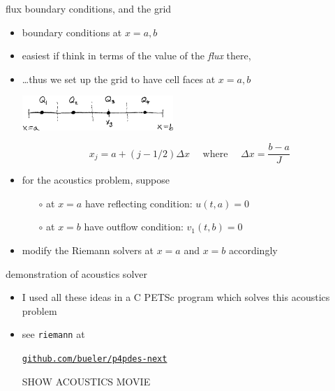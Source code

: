 \documentclass[10pt,dvipsnames,usepdftitle=false,
hyperref={pdftitle = {Finite volume methods},
    pdfauthor = {Ed Bueler}}]{beamer}
\begin{document}
\begin{frame}{flux boundary conditions, and the grid}

\begin{itemize}
\item boundary conditions at $x=a,b$
\item easiest if think in terms of the value of the \emph{flux} there,
\item \dots thus we set up the grid to have cell faces at $x=a,b$

\medskip
\begin{center}
\includegraphics[width=0.45\textwidth]{figs/fluxbdrysketch}
\end{center}

\vspace{-2mm}
    $$x_j = a + (j-1/2) \Delta x \quad \text{ where } \quad \Delta x = \frac{b-a}{J}$$

\item for the acoustics problem, suppose
    \begin{itemize}
    \item[$\circ$] at $x=a$ have reflecting condition: $u(t,a)=0$
    \item[$\circ$] at $x=b$ have outflow condition: $v_1(t,b)=0$
    \end{itemize}
\item modify the Riemann solvers at $x=a$ and $x=b$ accordingly
\end{itemize}
\end{frame}


\begin{frame}{demonstration of acoustics solver}

\begin{itemize}
\item I used all these ideas in a C PETSc program which solves this acoustics problem
\item see \texttt{riemann} at
\begin{center}
\href{https://github.com/bueler/p4pdes-next}{\texttt{github.com/bueler/p4pdes-next}}
\end{center}

\vspace{3mm}
\begin{center}
\alert{SHOW ACOUSTICS MOVIE}
\end{center}
\end{itemize}

\end{frame}
\end{document}
